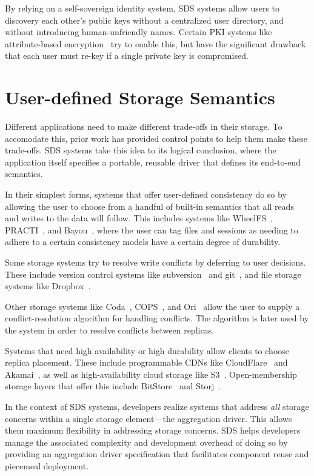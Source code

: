 By relying on a self-sovereign identity system, SDS systems allow users to
discovery each other's public keys without a centralized user directory, and
without introducing human-unfriendly names.  Certain PKI systems like
attribute-based encryption~\cite{abe} try to enable this, but have the significant
drawback that each user must re-key if a single private key is compromised.

\section{User-defined Storage Semantics}

Different applications need to make different trade-offs in their storage.  To
accomodate this, prior work has provided
control points to help them make these trade-offs.  SDS systems take
this idea to its logical conclusion, where the application itself specifies a
portable, reusable driver that defines its end-to-end semantics.

In their simplest forms, systems that offer user-defined consistency do so by
allowing the user to choose from a handful of built-in semantics that all reads
and writes to the data will follow.  This includes systems like
WheelFS~\cite{wheelfs}, PRACTI~\cite{practi}, and
Bayou~\cite{bayou}, where the user can tag files and sessions as needing to
adhere to a certain consistency models have a certain degree of
durability.

Some storage systems try to resolve write conflicts by deferring to user
decisions.  These include version control systems like
subversion~\cite{subversion} and git~\cite{git}, and file storage systems like
Dropbox~\cite{Dropbox}.

Other storage systems like Coda~\cite{coda}, COPS~\cite{cops}, and
Ori~\cite{ori} allow the user to supply a conflict-resolution algorithm for
handling conflicts.  The algorithm is later used by the system in order to
resolve conflicts between replicas.

Systems that need high availability or high durability allow clients to choose
replica placement.  These include programmable CDNs like
CloudFlare~\cite{cloudflare} and Akamai~\cite{akamai}, as well as
high-availability cloud storage like S3~\cite{s3}.  Open-membership storage
layers that offer this include BitStore~\cite{bitstore} and Storj~\cite{storj}.

In the context of SDS systems, developers realize systems that address
\emph{all} storage concerns within a single storage element---the aggregation
driver.  This allows them maximum flexibility in addressing storage concerns.
SDS helps developers manage the associated complexity and development overhead
of doing so by providing an aggregation driver specification that facilitates
component reuse and piecemeal deployment.

